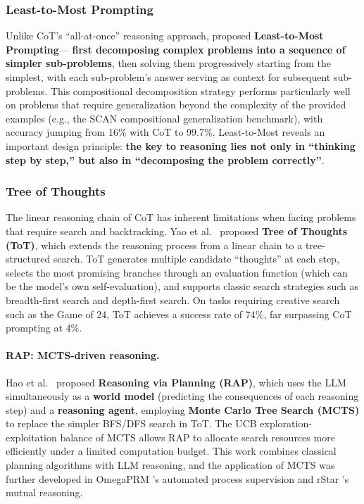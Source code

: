 \subsubsection{Least-to-Most Prompting}

Unlike CoT's ``all-at-once'' reasoning approach,
\citet{zhou2022least} proposed \textbf{Least-to-Most Prompting}---
\textbf{first decomposing complex problems into a sequence of simpler sub-problems},
then solving them progressively starting from the simplest, with each sub-problem's answer serving as context for subsequent sub-problems.
This compositional decomposition strategy performs particularly well on problems that require generalization beyond the complexity of the provided examples
(e.g., the SCAN compositional generalization benchmark),
with accuracy jumping from 16\% with CoT to 99.7\%.
Least-to-Most reveals an important design principle:
\textbf{the key to reasoning lies not only in ``thinking step by step,'' but also in ``decomposing the problem correctly''}.

\subsubsection{Tree of Thoughts}

The linear reasoning chain of CoT has inherent limitations when facing problems that require search and backtracking.
Yao et al.\ \cite{yao2023tot} proposed \textbf{Tree of Thoughts (ToT)},
which extends the reasoning process from a linear chain to a tree-structured search.
ToT generates multiple candidate ``thoughts'' at each step,
selects the most promising branches through an evaluation function (which can be the model's own self-evaluation),
and supports classic search strategies such as breadth-first search and depth-first search.
On tasks requiring creative search such as the Game of 24,
ToT achieves a success rate of 74\%, far surpassing CoT prompting at 4\%.

\paragraph{RAP: MCTS-driven reasoning.}
Hao et al.\ \cite{hao2023rap} proposed \textbf{Reasoning via Planning (RAP)},
which uses the LLM simultaneously as a \textbf{world model} (predicting the consequences of each reasoning step) and a \textbf{reasoning agent},
employing \textbf{Monte Carlo Tree Search (MCTS)} to replace the simpler BFS/DFS search in ToT.
The UCB exploration-exploitation balance of MCTS allows RAP to allocate search resources more efficiently under a limited computation budget.
This work combines classical planning algorithms with LLM reasoning,
and the application of MCTS was further developed in OmegaPRM \cite{luo2024omegaprm}'s automated process supervision
and rStar \cite{qi2024rstar}'s mutual reasoning.

